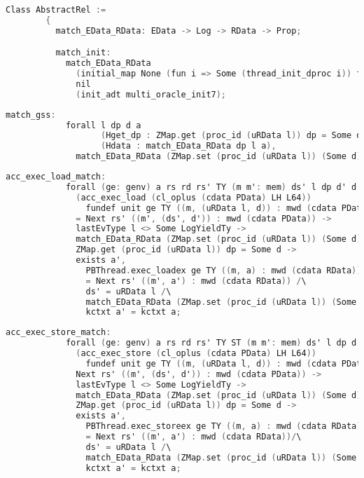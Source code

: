 \begin{lstlisting}[language=C]
      Class AbstractRel :=
        {
          match_EData_RData: EData -> Log -> RData -> Prop;

          match_init:
            match_EData_RData
              (initial_map None (fun i => Some (thread_init_dproc i)) full_thread_list)
              nil
              (init_adt multi_oracle_init7);
\end{lstlisting}
         
\begin{lstlisting}[language=C]          
          match_gss:
            forall l dp d a
                   (Hget_dp : ZMap.get (proc_id (uRData l)) dp = Some d)
                   (Hdata : match_EData_RData dp l a),
              match_EData_RData (ZMap.set (proc_id (uRData l)) (Some d) dp) l a;
\end{lstlisting}
         
\begin{lstlisting}[language=C]          
          acc_exec_load_match:
            forall (ge: genv) a rs rd rs' TY (m m': mem) ds' l dp d' d addr,
              (acc_exec_load (cl_oplus (cdata PData) LH L64)) 
                fundef unit ge TY ((m, (uRData l, d)) : mwd (cdata PData)) addr rs rd 
              = Next rs' ((m', (ds', d')) : mwd (cdata PData)) ->
              lastEvType l <> Some LogYieldTy ->
              match_EData_RData (ZMap.set (proc_id (uRData l)) (Some d) dp) l a ->
              ZMap.get (proc_id (uRData l)) dp = Some d ->
              exists a',
                PBThread.exec_loadex ge TY ((m, a) : mwd (cdata RData)) addr rs rd 
                = Next rs' ((m', a') : mwd (cdata RData)) /\
                ds' = uRData l /\
                match_EData_RData (ZMap.set (proc_id (uRData l)) (Some d') dp) l a' /\
                kctxt a' = kctxt a;
\end{lstlisting}
         
\begin{lstlisting}[language=C]     
          acc_exec_store_match:
            forall (ge: genv) a rs rd rs' TY ST (m m': mem) ds' l dp d' d addr,
              (acc_exec_store (cl_oplus (cdata PData) LH L64)) 
                fundef unit ge TY ((m, (uRData l, d)) : mwd (cdata PData)) addr rs rd ST =
              Next rs' ((m', (ds', d')) : mwd (cdata PData)) -> 
              lastEvType l <> Some LogYieldTy ->
              match_EData_RData (ZMap.set (proc_id (uRData l)) (Some d) dp) l a ->
              ZMap.get (proc_id (uRData l)) dp = Some d ->
              exists a',
                PBThread.exec_storeex ge TY ((m, a) : mwd (cdata RData)) addr rs rd ST 
                = Next rs' ((m', a') : mwd (cdata RData))/\
                ds' = uRData l /\
                match_EData_RData (ZMap.set (proc_id (uRData l)) (Some d') dp) l a' /\
                kctxt a' = kctxt a;
\end{lstlisting}
         
